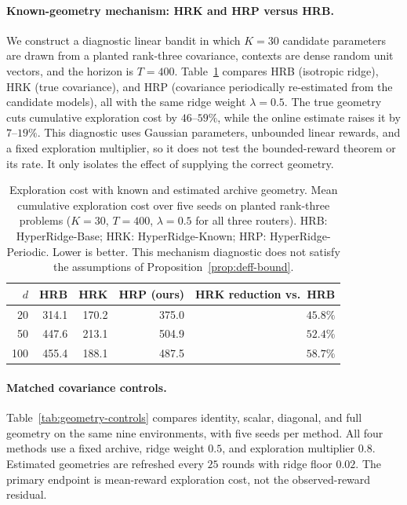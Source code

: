 \documentclass{article} %
\begin{document}
\paragraph{Known-geometry mechanism: HRK and HRP versus HRB.}
We construct a diagnostic linear bandit in which $K=30$ candidate parameters are drawn from a planted rank-three covariance, contexts are dense random unit vectors, and the horizon is $T=400$. Table~\ref{tab:hyper-diagnostic} compares HRB (isotropic ridge), HRK (true covariance), and HRP (covariance periodically re-estimated from the candidate models), all with the same ridge weight $\lambda=0.5$. The true geometry cuts cumulative exploration cost by $46$--$59\%$, while the online estimate raises it by $7$--$19\%$. This diagnostic uses Gaussian parameters, unbounded linear rewards, and a fixed exploration multiplier, so it does not test the bounded-reward theorem or its rate. It only isolates the effect of supplying the correct geometry.

\begin{table}[H]
\centering
\small
\begin{tabular}{rrrrr}
\toprule
$d$ & HRB & HRK & HRP (ours) & HRK reduction vs.\ HRB \\
\midrule
20  & 314.1 & 170.2 & 375.0 & $45.8\%$ \\
50  & 447.6 & 213.1 & 504.9 & $52.4\%$ \\
100 & 455.4 & 188.1 & 487.5 & $58.7\%$ \\
\bottomrule
\end{tabular}
\caption{Exploration cost with known and estimated archive geometry.
Mean cumulative exploration cost over five seeds on planted rank-three
problems ($K=30$, $T=400$, $\lambda=0.5$ for all three routers).
HRB: HyperRidge-Base; HRK: HyperRidge-Known; HRP: HyperRidge-Periodic.
Lower is better. This mechanism diagnostic does not satisfy the assumptions
of Proposition~\ref{prop:deff-bound}.}
\label{tab:hyper-diagnostic}
\end{table}

\paragraph{Matched covariance controls.}
Table~\ref{tab:geometry-controls} compares identity, scalar, diagonal, and
full geometry on the same nine environments, with five seeds per method.
All four methods use a fixed archive, ridge weight $0.5$, and exploration
multiplier $0.8$. Estimated geometries are refreshed every $25$ rounds with
ridge floor $0.02$. The primary endpoint is mean-reward exploration cost,
not the observed-reward residual.
\end{document}
